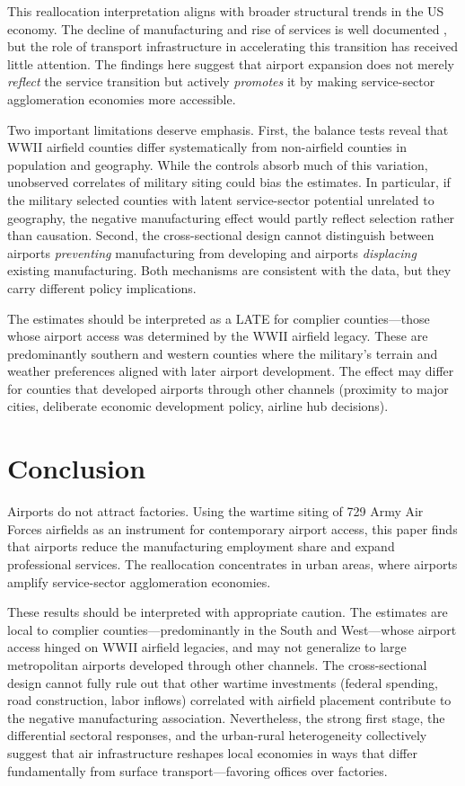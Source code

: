 \documentclass[12pt]{article}
\begin{document}
This reallocation interpretation aligns with broader structural trends in the US economy. The decline of manufacturing and rise of services is well documented \citep{herrendorf2014}, but the role of transport infrastructure in accelerating this transition has received little attention. The findings here suggest that airport expansion does not merely \emph{reflect} the service transition but actively \emph{promotes} it by making service-sector agglomeration economies more accessible.

Two important limitations deserve emphasis. First, the balance tests reveal that WWII airfield counties differ systematically from non-airfield counties in population and geography. While the controls absorb much of this variation, unobserved correlates of military siting could bias the estimates. In particular, if the military selected counties with latent service-sector potential unrelated to geography, the negative manufacturing effect would partly reflect selection rather than causation. Second, the cross-sectional design cannot distinguish between airports \emph{preventing} manufacturing from developing and airports \emph{displacing} existing manufacturing. Both mechanisms are consistent with the data, but they carry different policy implications.

The estimates should be interpreted as a LATE for complier counties---those whose airport access was determined by the WWII airfield legacy. These are predominantly southern and western counties where the military's terrain and weather preferences aligned with later airport development. The effect may differ for counties that developed airports through other channels (proximity to major cities, deliberate economic development policy, airline hub decisions).

\section{Conclusion}

Airports do not attract factories. Using the wartime siting of 729 Army Air Forces airfields as an instrument for contemporary airport access, this paper finds that airports reduce the manufacturing employment share and expand professional services. The reallocation concentrates in urban areas, where airports amplify service-sector agglomeration economies.

These results should be interpreted with appropriate caution. The estimates are local to complier counties---predominantly in the South and West---whose airport access hinged on WWII airfield legacies, and may not generalize to large metropolitan airports developed through other channels. The cross-sectional design cannot fully rule out that other wartime investments (federal spending, road construction, labor inflows) correlated with airfield placement contribute to the negative manufacturing association. Nevertheless, the strong first stage, the differential sectoral responses, and the urban-rural heterogeneity collectively suggest that air infrastructure reshapes local economies in ways that differ fundamentally from surface transport---favoring offices over factories.
\end{document}
